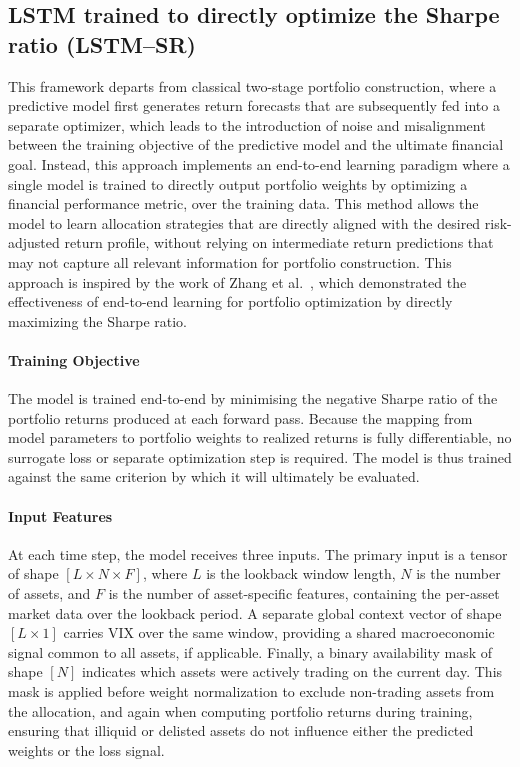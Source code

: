 \subsection{LSTM trained to directly optimize the Sharpe ratio (LSTM--SR)}

This framework departs from classical two-stage portfolio construction, where a predictive model first generates return forecasts that are subsequently fed into a separate optimizer, which leads to the introduction of noise and misalignment between the training objective of the predictive model and the ultimate financial goal. Instead, this approach implements an end-to-end learning paradigm where a single model is trained to directly output portfolio weights by optimizing a financial performance metric, over the training data. This method allows the model to learn allocation strategies that are directly aligned with the desired risk-adjusted return profile, without relying on intermediate return predictions that may not capture all relevant information for portfolio construction. This approach is inspired by the work of Zhang et al.~\cite{984be}, which demonstrated the effectiveness of end-to-end learning for portfolio optimization by directly maximizing the Sharpe ratio.

\paragraph{Training Objective} The model is trained end-to-end by minimising the negative Sharpe ratio of the portfolio returns produced at each forward pass. Because the mapping from model parameters to portfolio weights to realized returns is fully differentiable, no surrogate loss or separate optimization step is required. The model is thus trained against the same criterion by which it will ultimately be evaluated.

\paragraph{Input Features} At each time step, the model receives three inputs. The primary input is a tensor of shape $[L \times N \times F]$, where $L$ is the lookback window length, $N$ is the number of assets, and $F$ is the number of asset-specific features, containing the per-asset market data over the lookback period. A separate global context vector of shape $[L \times 1]$ carries VIX over the same window, providing a shared macroeconomic signal common to all assets, if applicable. Finally, a binary availability mask of shape $[N]$ indicates which assets were actively trading on the current day. This mask is applied before weight normalization to exclude non-trading assets from the allocation, and again when computing portfolio returns during training, ensuring that illiquid or delisted assets do not influence either the predicted weights or the loss signal.

